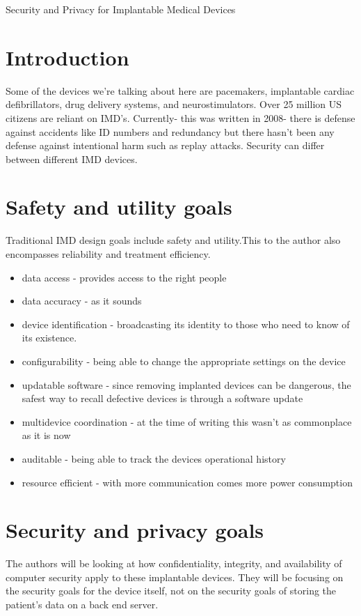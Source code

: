 \documentclass{article}
\begin{document}
\begin{center}
\LARGE Security and Privacy for Implantable Medical Devices
\end{center}
\section*{Introduction}
Some of the devices we're talking about here are pacemakers, implantable cardiac defibrillators, drug delivery systems, and neurostimulators. Over 25 million US citizens are reliant on IMD's. Currently- this was written in 2008- there is defense against accidents like ID numbers and redundancy but there hasn't been any defense against intentional harm such as replay attacks. Security can differ between different IMD devices. 

\section*{Safety and utility goals}
Traditional IMD design goals include safety and utility.This to the author also encompasses reliability and treatment efficiency.
\begin{itemize}
\item data access - provides access to the right people
\item data accuracy - as it sounds
\item device identification - broadcasting its identity to those who need to know of its existence. 
\item configurability - being able to change the appropriate settings on the device
\item updatable software - since removing implanted devices can be dangerous, the safest way to recall defective devices is through a software update
\item multidevice coordination - at the time of writing this wasn't as commonplace as it is now
\item auditable - being able to track the devices operational history
\item resource efficient - with more communication comes more power consumption
\end{itemize}

\section*{Security and privacy goals}
The authors will be looking at how confidentiality, integrity, and availability of computer security apply to these implantable devices. They will be focusing on the security goals for the device itself, not on the security goals of storing the patient's data on a back end server.
\end{document}
